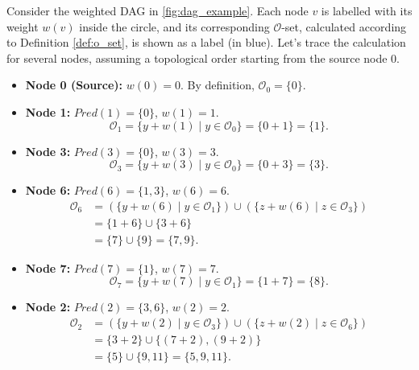 \begin{example}
    \label{ex:o_set_calc}
    Consider the weighted DAG in \autoref{fig:dag_example}. Each node $v$ is labelled with its weight $w(v)$ inside the circle, and its corresponding $\mathcal{O}$-set, calculated according to Definition \ref{def:o_set}, is shown as a label (in blue). Let's trace the calculation for several nodes, assuming a topological order starting from the source node 0.

    \begin{itemize}
        \item \textbf{Node 0 (Source):} $w(0)=0$. By definition, $\mathcal{O}_0 = \{0\}$.
        \item \textbf{Node 1:} $Pred(1)=\{0\}$, $w(1)=1$.
              \[ \mathcal{O}_1 = \{ y + w(1) \mid y \in \mathcal{O}_0 \} = \{ 0 + 1 \} = \{1\}. \]
        \item \textbf{Node 3:} $Pred(3)=\{0\}$, $w(3)=3$.
              \[ \mathcal{O}_3 = \{ y + w(3) \mid y \in \mathcal{O}_0 \} = \{ 0 + 3 \} = \{3\}. \]
        \item \textbf{Node 6:} $Pred(6)=\{1, 3\}$, $w(6)=6$.
              \begin{align*}
                  \mathcal{O}_6 & = \left( \{ y + w(6) \mid y \in \mathcal{O}_1 \} \right) \cup \left( \{ z + w(6) \mid z \in \mathcal{O}_3 \} \right) \\
                                & = \{ 1 + 6 \} \cup \{ 3 + 6 \}                                                                                       \\
                                & = \{7\} \cup \{9\} = \{7, 9\}.
              \end{align*}
        \item \textbf{Node 7:} $Pred(7)=\{1\}$, $w(7)=7$.
              \[ \mathcal{O}_7 = \{ y + w(7) \mid y \in \mathcal{O}_1 \} = \{ 1 + 7 \} = \{8\}. \]
        \item \textbf{Node 2:} $Pred(2)=\{3, 6\}$, $w(2)=2$.
              \begin{align*}
                  \mathcal{O}_2 & = \left( \{ y + w(2) \mid y \in \mathcal{O}_3 \} \right) \cup \left( \{ z + w(2) \mid z \in \mathcal{O}_6 \} \right) \\
                                & = \{ 3 + 2 \} \cup \{ (7+2), (9+2) \}                                                                                \\
                                & = \{5\} \cup \{9, 11\} = \{5, 9, 11\}.
              \end{align*}


\end{itemize}
\end{example}
